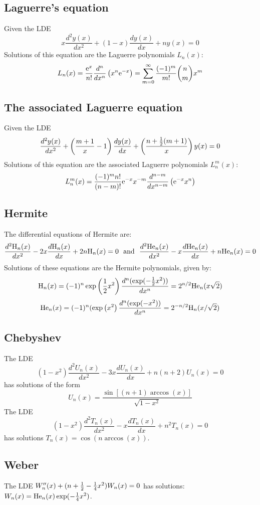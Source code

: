 \documentclass[a4paper,fancyheadings,twoside]{report}
\begin{document}
\subsection{Laguerre's equation}
Given the LDE
\[
x\frac{d^2y(x)}{dx^2}+(1-x)\frac{dy(x)}{dx}+ny(x)=0
\]
Solutions of this equation are the Laguerre polynomials $L_n(x)$:
\[
L_n(x)=\frac{{\rm e}^x}{n!}\frac{d^n}{dx^n}\left(x^n{\rm e}^{-x}\right)=
\sum_{m=0}^\infty\frac{(-1)^m}{m!}{n\choose m}x^m
\]

\subsection{The associated Laguerre equation}
Given the LDE
\[
\frac{d^2y(x)}{dx^2}+\left(\frac{m+1}{x}-1\right)\frac{dy(x)}{dx}+\left(\frac{n+\mbox{$\frac{1}{2}$}(m+1)}{x}\right)y(x)=0
\]
Solutions of this equation are the associated Laguerre polynomials $L_n^m(x)$:
\[
L_n^m(x)=\frac{(-1)^mn!}{(n-m)!}{\rm e}^{-x}x^{-m}\frac{d^{n-m}}{dx^{n-m}}\left({\rm e}^{-x}x^n\right)
\]

\subsection{Hermite}
\def\Hn{{\rm H}_n}
\def\Hen{{\rm He}_n}
The differential equations of Hermite are:
\[
\frac{d^2\Hn(x)}{dx^2}-2x\frac{d\Hn(x)}{dx}+2n\Hn(x)=0~~\mbox{and}~~
\frac{d^2\Hen(x)}{dx^2}-x\frac{d\Hen(x)}{dx}+n\Hen(x)=0
\]
Solutions of these equations are the Hermite polynomials, given by:
\[
\Hn(x)=(-1)^n\exp\left(\frac{1}{2}x^2\right)\frac{d^n(\exp(-\half x^2))}{dx^n}=2^{n/2}\Hen(x\sqrt{2})
\]
\[
\Hen(x)=(-1)^n(\exp\left(x^2\right)\frac{d^n(\exp(-x^2))}{dx^n}=2^{-n/2}\Hn(x/\sqrt{2})
\]

\subsection{Chebyshev}
The LDE
\[
(1-x^2)\frac{d^2U_n(x)}{dx^2}-3x\frac{dU_n(x)}{dx}+n(n+2)U_n(x)=0
\]
has solutions of the form
\[
U_n(x)=\frac{\sin[(n+1)\arccos(x)]}{\sqrt{1-x^2}}
\]
The LDE
\[
(1-x^2)\frac{d^2T_n(x)}{dx^2}-x\frac{dT_n(x)}{dx}+n^2T_n(x)=0
\]
has solutions $T_n(x)=\cos(n\arccos(x))$.

\subsection{Weber}
The LDE $W''_n(x)+(n+\mbox{$\frac{1}{2}$}-\mbox{$\frac{1}{4}$} x^2)W_n(x)=0$ has solutions:
$W_n(x)={\rm He}_n(x)\exp(-\mbox{$\frac{1}{4}$} x^2)$.
\end{document}

